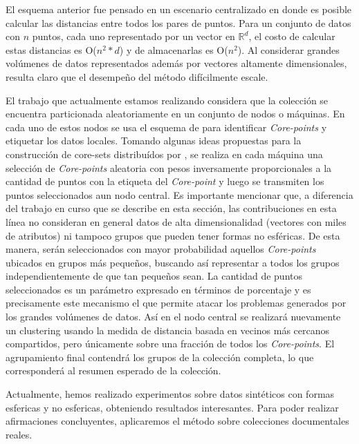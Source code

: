 \documentclass[10pt]{article}
\begin{document}
El esquema anterior fue pensado en un escenario centralizado en donde es posible calcular las distancias entre todos los pares de puntos. Para un conjunto de datos con $n$ puntos, cada uno representado por un vector en $\mathbb{R}^d$, el costo de calcular estas distancias es O($n^2 * d$) y de almacenarlas es O($n^2$). Al considerar grandes volúmenes de datos representados además por vectores altamente dimensionales, resulta claro que el desempe\~no del método difícilmente escale.

El trabajo que actualmente estamos realizando considera que la colección se encuentra particionada aleatoriamente en un conjunto de nodos o máquinas. En cada uno de estos nodos se usa el esquema de \cite{ESK03} para identificar \textit{Core-points} y etiquetar los datos locales. Tomando algunas ideas propuestas para la construcción de core-sets distribuídos por \cite{BEL13}, se realiza en cada máquina una selección de \textit{Core-points} aleatoria con pesos inversamente proporcionales a la cantidad de puntos con la etiqueta del \textit{Core-point} y luego se transmiten los puntos seleccionados aun nodo central. Es importante mencionar que, a diferencia del trabajo en curso que se describe en esta sección, las contribuciones en esta línea no consideran en general datos de alta dimensionalidad (vectores con miles de atributos) ni tampoco grupos que pueden tener formas no esféricas. De esta manera, serán seleccionados con mayor probabilidad aquellos \textit{Core-points} ubicados en grupos más pequeños, buscando así representar a todos los grupos independientemente de que tan peque\~nos sean. La cantidad de puntos seleccionados es un parámetro expresado en términos de porcentaje y es precisamente este mecanismo el que permite atacar los problemas generados por los grandes volúmenes de datos. Así en el nodo central se realizará nuevamente un clustering usando la medida de distancia basada en vecinos más cercanos compartidos, pero únicamente sobre una fracción de todos los \textit{Core-points}. El agrupamiento final contendrá los grupos de la colección completa, lo que corresponderá al resumen esperado de la colección.

Actualmente, hemos realizado experimentos sobre datos sintéticos con formas esfericas y no esfericas, obteniendo resultados interesantes. Para poder realizar afirmaciones concluyentes, aplicaremos el método sobre colecciones documentales reales.


\end{document}
